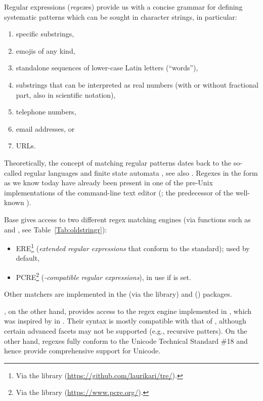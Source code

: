 \documentclass[nojss]{jss}
\begin{document}
Regular expressions (\textit{regex}es) provide us with a concise
grammar for defining systematic patterns which can be sought in character
strings, in particular:
\begin{enumerate}
   \item specific substrings,
   \item emojis of any kind,
   \item standalone sequences of lower-case Latin letters (``words''),
   \item substrings that can be interpreted as real numbers
   (with or without fractional part, also in scientific notation),
   \item telephone numbers,
   \item email addresses, or
   \item URLs.
\end{enumerate}
Theoretically, the concept of matching regular patterns
dates back to the so-called regular languages and finite state automata \citep{kleene},
see also \citep{hopcroftullman,automata}.
Regexes in the form as we know today have already been present
in one of the pre-Unix implementations of the command-line text
editor  (\citealp{qed}; the predecessor of the well-known ).

Base   gives access to two different regex matching engines
(via functions such as  and ,
see Table~\ref{Tab:oldstringr}):
\begin{itemize}
\item {ERE}\footnote{Via the  library (\url{https://github.com/laurikari/tre/}).} (\textit{extended regular expressions} that conform to the  standard);
used by default,
\item {PCRE}\footnote{Via the  library (\url{https://www.pcre.org/}).} (\textit{-compatible regular expressions}),
in use if  is set.
\end{itemize}
Other matchers are implemented in the  (via the  library)
and  () packages.


, on the other hand, provides access to the regex engine
implemented in , which was inspired by  
in . Their syntax is mostly compatible with that of ,
although certain advanced facets may not be supported (e.g., recursive
patters). On the other hand,  regexes fully conform to the
Unicode Technical Standard \#18 \citep{uts18:regex} and hence provide
comprehensive support for Unicode.
\end{document}

